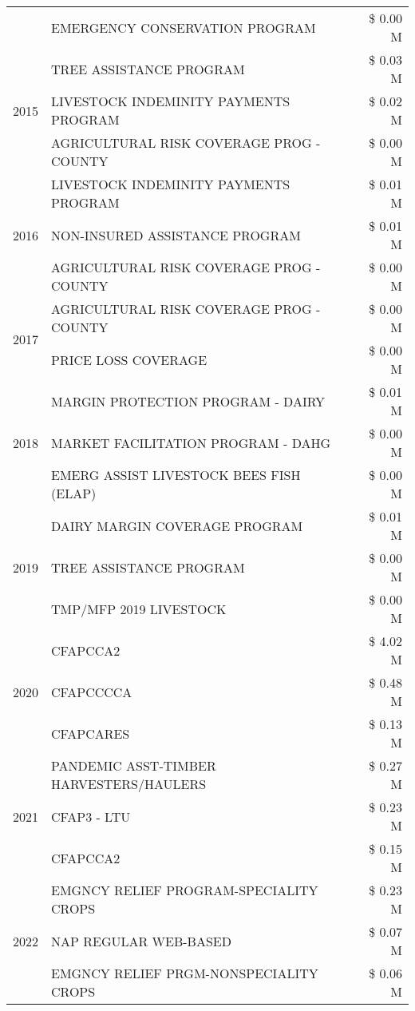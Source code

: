 \begin{tabular}{llr}
 & EMERGENCY CONSERVATION PROGRAM & \$ 0.00 M \\
\cline{1-3}
\multirow[t]{3}{*}{2015} & TREE ASSISTANCE PROGRAM & \$ 0.03 M \\
 & LIVESTOCK INDEMINITY PAYMENTS PROGRAM & \$ 0.02 M \\
 & AGRICULTURAL RISK COVERAGE PROG - COUNTY & \$ 0.00 M \\
\cline{1-3}
\multirow[t]{3}{*}{2016} & LIVESTOCK INDEMINITY PAYMENTS PROGRAM & \$ 0.01 M \\
 & NON-INSURED ASSISTANCE PROGRAM & \$ 0.01 M \\
 & AGRICULTURAL RISK COVERAGE PROG - COUNTY & \$ 0.00 M \\
\cline{1-3}
\multirow[t]{2}{*}{2017} & AGRICULTURAL RISK COVERAGE PROG - COUNTY & \$ 0.00 M \\
 & PRICE LOSS COVERAGE & \$ 0.00 M \\
\cline{1-3}
\multirow[t]{3}{*}{2018} & MARGIN PROTECTION PROGRAM - DAIRY & \$ 0.01 M \\
 & MARKET FACILITATION PROGRAM - DAHG & \$ 0.00 M \\
 & EMERG ASSIST LIVESTOCK BEES FISH (ELAP) & \$ 0.00 M \\
\cline{1-3}
\multirow[t]{3}{*}{2019} & DAIRY MARGIN COVERAGE PROGRAM & \$ 0.01 M \\
 & TREE ASSISTANCE PROGRAM & \$ 0.00 M \\
 & TMP/MFP 2019 LIVESTOCK & \$ 0.00 M \\
\cline{1-3}
\multirow[t]{3}{*}{2020} & CFAPCCA2 & \$ 4.02 M \\
 & CFAPCCCCA & \$ 0.48 M \\
 & CFAPCARES & \$ 0.13 M \\
\cline{1-3}
\multirow[t]{3}{*}{2021} & PANDEMIC ASST-TIMBER HARVESTERS/HAULERS & \$ 0.27 M \\
 & CFAP3 - LTU & \$ 0.23 M \\
 & CFAPCCA2 & \$ 0.15 M \\
\cline{1-3}
\multirow[t]{3}{*}{2022} & EMGNCY RELIEF PROGRAM-SPECIALITY CROPS & \$ 0.23 M \\
 & NAP REGULAR WEB-BASED & \$ 0.07 M \\
 & EMGNCY RELIEF PRGM-NONSPECIALITY CROPS & \$ 0.06 M \\
\cline{1-3}
\bottomrule
\end{tabular}
